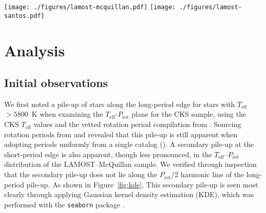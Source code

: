 \documentclass[linenumbers,trackchanges,twocolumn]{aastex631}
\newcommand{\lamostmcq}{LAMOST--McQuillan\xspace}
\newcommand{\lamostsan}{LAMOST--Santos\xspace}
\newcommand{\teff}{\ensuremath{T_{\mathrm{eff}}}\xspace}
\newcommand{\logg}{\ensuremath{\log g}\xspace}
\newcommand{\prot}{\ensuremath{P_\mathrm{rot}}\xspace}
\begin{document}
\begin{figure*}
    \centering
    \texttt{[image: ./figures/lamost-mcquillan.pdf]}
    \texttt{[image: ./figures/lamost-santos.pdf]}
    \caption{Two-dimensional histograms indicating the number of Kepler target stars in the \teff–\prot plane for the \lamostmcq sample (top row) and the \lamostsan sample (bottom row). The effects of a simple cut in \logg to separate subgiants and dwarfs are shown in the middle and right columns. In each panel the Sun is indicated by the orange point, with an errorbar reflecting the range of periods measured from its differentially rotating surface. The long-period pile-up for dwarf stars is clearly seen to extend to the solar temperature. The short-period pile-up is clearer in the smaller \lamostmcq dwarf sample, potentially because the \citet{Santos2021} catalog detected more stars at longer periods. The secondary overdensity observed in the subgiant samples, most visible in the bottom center panel, appears to be at twice the period of the primary overdensity, potentially due to erroneously determined rotation periods.}
    \label{fig:xmatch}
\end{figure*}


\section{Analysis}
\label{sec:analysis}

\subsection{Initial observations}
We first noted a pile-up of stars along the long-period edge for stars with \teff~$>5800$~K when examining the \teff-\prot plane for the CKS sample, using the CKS \teff values and the vetted rotation period compilation from \citet{David2021}. Sourcing rotation periods from \citet{McQuillan2013, Mazeh2015} and \citet{Angus2018} revealed that this pile-up is still apparent when adopting periods uniformly from a single catalog (). A secondary pile-up at the short-period edge is also apparent, though less pronounced, in the \teff--\prot distribution of the \lamostmcq sample. We verified through inspection that the secondary pile-up does not lie along the \prot/2 harmonic line of the long-period pile-up. As shown in Figure~\ref{fig:kde}, This secondary pile-up is seen most clearly through applying Gaussian kernel density estimation (KDE), which was performed with the \texttt{seaborn} package \citep{seaborn}. 
\end{document}
